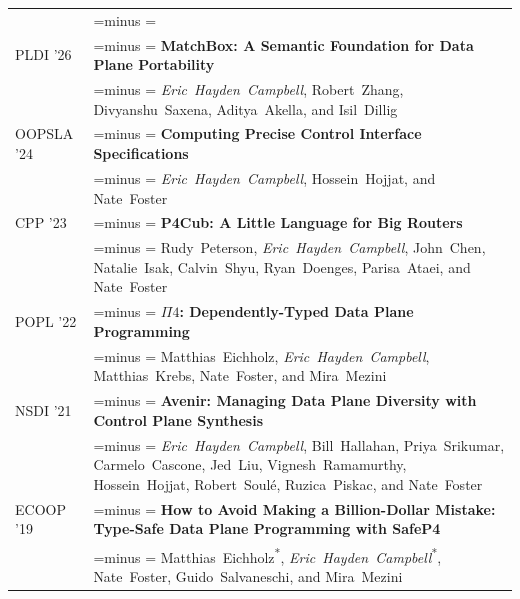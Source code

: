 \documentclass[letterpaper,10pt,oneside]{article}
\makeatletter
\newcommand{\pubtitle}[1]{\textbf{#1}}
\newcommand{\authors}[1]{#1}
\newcommand{\me}{\mbox{\textit{Eric Hayden Campbell}}}
\newcommand{\venuenote}[1]{\leavevmode{\footnotesize\itshape\color{black!70}#1}}
\newcommand{\distinguished}{\venuenote{\textbf{Distinguished Paper}}}
\newcommand{\eqcontrib}{\textsuperscript{*}}
\newcommand{\authorseq}[1]{%
  \authors{#1}\hfill
  \makebox[0pt][r]{\raisebox{-0.95\baselineskip}[0pt][0pt]{\scriptsize\spaceskip=\fontdimen2\font\color{black!55}\textsuperscript{*}Equal contribution}}}
\newlength{\leftcol}  \setlength{\leftcol}{1.05in}
\newlength{\colsep}   \setlength{\colsep}{1em}
\newlength{\rightcol}
\newcommand{\balancedrag}{%
  \setlength{\rightskip}{0pt plus 0.45\rightcol}%
  \setlength{\parfillskip}{0pt}%
  \spaceskip=\fontdimen2\font minus \fontdimen4\font
  \xspaceskip=\spaceskip
  \hbadness=10000 \hyphenpenalty=10000 \exhyphenpenalty=10000 \emergencystretch=0pt}
\newenvironment{cvsection}[1]
  {\par\vspace{0.9em}%
   \setlength{\rightcol}{\dimexpr\linewidth-\leftcol-\colsep\relax}%
   \noindent\begin{longtable}[l]{@{}>{\raggedleft\arraybackslash}p{\leftcol}@{\hspace{\colsep}}>{\raggedright\balancedrag\arraybackslash}p{\rightcol}@{}}
   \multicolumn{2}{@{}l}{\Large #1} \\*\noalign{\nobreak\vspace{0.4em}}}
  {\end{longtable}}
\newcommand{\gap}{\noalign{\vspace{0.4em}}}
\makeatother
\begin{document}

\begin{cvsection}{Publications: Formal Foundations of Networking}

  PLDI '26 & \pubtitle{MatchBox: A Semantic Foundation for Data Plane Portability} \\*
  \distinguished & \authors{\me, Robert~Zhang, Divyanshu~Saxena, Aditya~Akella, and Isil~Dillig} \\
  \gap

  OOPSLA '24 & \pubtitle{Computing Precise Control Interface Specifications} \\*
  & \authors{\me, Hossein~Hojjat, and Nate~Foster} \\
  \gap

  CPP '23 & \pubtitle{P4Cub: A Little Language for Big Routers} \\*
  & \authors{Rudy~Peterson, \me, John~Chen, Natalie~Isak, Calvin~Shyu, Ryan~Doenges, Parisa~Ataei, and Nate~Foster} \\
  \gap

  POPL '22 & \pubtitle{$\Pi4$: Dependently-Typed Data Plane Programming} \\*
  & \authors{Matthias~Eichholz, \me, Matthias~Krebs, Nate~Foster, and Mira~Mezini} \\
  \gap

  NSDI '21 & \pubtitle{Avenir: Managing Data Plane Diversity with Control Plane Synthesis} \\*
  & \authors{\me, Bill~Hallahan, Priya~Srikumar, Carmelo~Cascone, Jed~Liu, Vignesh~Ramamurthy, Hossein~Hojjat, Robert~Soul\'{e}, Ruzica~Piskac, and Nate~Foster} \\
  \gap

  ECOOP '19 & \pubtitle{How to Avoid Making a Billion-Dollar Mistake: Type-Safe Data Plane Programming with SafeP4} \\*
  & \authorseq{Matthias~Eichholz\eqcontrib, \me\eqcontrib, Nate~Foster, Guido~Salvaneschi, and Mira~Mezini} \\

\end{cvsection}
\end{document}
